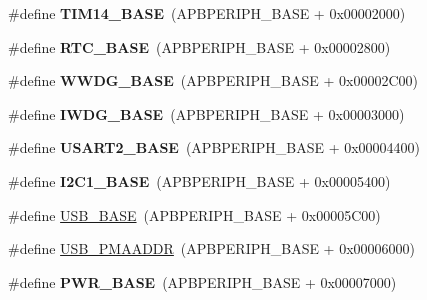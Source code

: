 \begin{DoxyCompactItemize}
\item 
\mbox{\label{group___peripheral__memory__map_ga862855347d6e1d92730dfe17ee8e90b8}} 
\#define {\bfseries T\+I\+M14\+\_\+\+B\+A\+SE}~(A\+P\+B\+P\+E\+R\+I\+P\+H\+\_\+\+B\+A\+SE + 0x00002000)
\item 
\mbox{\label{group___peripheral__memory__map_ga4265e665d56225412e57a61d87417022}} 
\#define {\bfseries R\+T\+C\+\_\+\+B\+A\+SE}~(A\+P\+B\+P\+E\+R\+I\+P\+H\+\_\+\+B\+A\+SE + 0x00002800)
\item 
\mbox{\label{group___peripheral__memory__map_ga9a5bf4728ab93dea5b569f5b972cbe62}} 
\#define {\bfseries W\+W\+D\+G\+\_\+\+B\+A\+SE}~(A\+P\+B\+P\+E\+R\+I\+P\+H\+\_\+\+B\+A\+SE + 0x00002\+C00)
\item 
\mbox{\label{group___peripheral__memory__map_ga8543ee4997296af5536b007cd4748f55}} 
\#define {\bfseries I\+W\+D\+G\+\_\+\+B\+A\+SE}~(A\+P\+B\+P\+E\+R\+I\+P\+H\+\_\+\+B\+A\+SE + 0x00003000)
\item 
\mbox{\label{group___peripheral__memory__map_gade83162a04bca0b15b39018a8e8ec090}} 
\#define {\bfseries U\+S\+A\+R\+T2\+\_\+\+B\+A\+SE}~(A\+P\+B\+P\+E\+R\+I\+P\+H\+\_\+\+B\+A\+SE + 0x00004400)
\item 
\mbox{\label{group___peripheral__memory__map_gacd72dbffb1738ca87c838545c4eb85a3}} 
\#define {\bfseries I2\+C1\+\_\+\+B\+A\+SE}~(A\+P\+B\+P\+E\+R\+I\+P\+H\+\_\+\+B\+A\+SE + 0x00005400)
\item 
\#define \hyperlink{group___peripheral__memory__map_gaa6c4cbed4ddbb3ecd77de93fab2a2e04}{U\+S\+B\+\_\+\+B\+A\+SE}~(A\+P\+B\+P\+E\+R\+I\+P\+H\+\_\+\+B\+A\+SE + 0x00005\+C00)
\item 
\#define \hyperlink{group___peripheral__memory__map_gaf992dfdd5707568c5cb5506e2347e808}{U\+S\+B\+\_\+\+P\+M\+A\+A\+D\+DR}~(A\+P\+B\+P\+E\+R\+I\+P\+H\+\_\+\+B\+A\+SE + 0x00006000)
\item 
\mbox{\label{group___peripheral__memory__map_gac691ec23dace8b7a649a25acb110217a}} 
\#define {\bfseries P\+W\+R\+\_\+\+B\+A\+SE}~(A\+P\+B\+P\+E\+R\+I\+P\+H\+\_\+\+B\+A\+SE + 0x00007000)

\end{DoxyCompactItemize}
